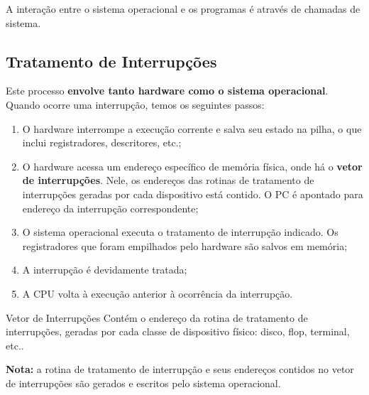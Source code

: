 A interação entre o sistema operacional e os programas é através de chamadas de sistema.



\subsection{Tratamento de Interrupções}

Este processo \textbf{envolve tanto hardware como o sistema operacional}. Quando ocorre uma interrupção, temos os seguintes passos:
\begin{enumerate}
  \item O hardware interrompe a execução corrente e salva seu estado na pilha, o que inclui registradores, descritores, etc.;

  \item O hardware acessa um endereço específico de memória física, onde há o \textbf{vetor de interrupções}. Nele, os endereços das rotinas de tratamento de interrupções geradas por cada dispositivo está contido. O PC é apontado para endereço da interrupção correspondente;

  \item O sistema operacional executa o tratamento de interrupção indicado. Os registradores que foram empilhados pelo hardware são salvos em memória;

  \item A interrupção é devidamente tratada;

  \item A CPU volta à execução anterior à ocorrência da interrupção.
\end{enumerate}

\begin{definicao}{Vetor de Interrupções}
  Contém o endereço da rotina de tratamento de interrupções, geradas por cada classe de dispositivo físico: disco, flop, terminal, etc..
\end{definicao}


\textbf{Nota:} a rotina de tratamento de interrupção e seus endereços contidos no vetor de interrupções são gerados e escritos pelo sistema operacional.



















